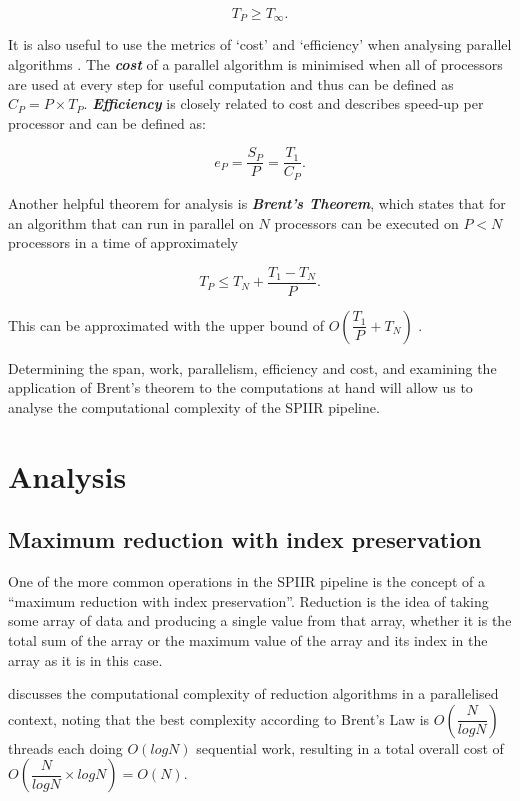 \documentclass{article}
\begin{document}
\[
    T_P \geq T_\infty.
\]

It is also useful to use the metrics of `cost' and `efficiency' when analysing parallel algorithms \cite{brent}.
The \textit{\textbf{cost}} of a parallel algorithm is minimised when all of processors are used at every step for useful computation and thus can be defined as \(C_P = P\times{T_P}\).
\textit{\textbf{Efficiency}} is closely related to cost and describes speed-up per processor and can be defined as:

\[
    e_P = \dfrac{S_P}{P} = \dfrac{T_1}{C_P}.
\]

Another helpful theorem for analysis is \textit{\textbf{Brent's Theorem}}, which states that for an algorithm that can run in parallel on \(N\) processors can be executed on \(P < N\) processors in a time of approximately \cite{BrentsLaw}

\[
    T_P \leq T_N + \dfrac{T_1-T_N}{P}.
\]

This can be approximated with the upper bound of \(O(\dfrac{T_1}{P} + T_N)\) \cite{brent}.

Determining the span, work, parallelism, efficiency and cost, and examining the application of Brent's theorem to the computations at hand will allow us to analyse the computational complexity of the SPIIR pipeline.

\section{Analysis} \label{sec:analysis}
\subsection{Maximum reduction with index preservation} \label{sec:reduce}

One of the more common operations in the SPIIR pipeline is the concept of a ``maximum reduction with index preservation''.
Reduction is the idea of taking some array of data and producing a single value from that array, whether it is the total sum of the array or the maximum value of the array and its index in the array as it is in this case.

\cite{reduction} discusses the computational complexity of reduction algorithms in a parallelised context, noting that the best complexity according to Brent's Law is \(O(\dfrac{N}{log N})\) threads each doing \(O(log N)\) sequential work, resulting in a total overall cost of \(O(\dfrac{N}{log N}\times{log N}) = O(N)\).
\end{document}
